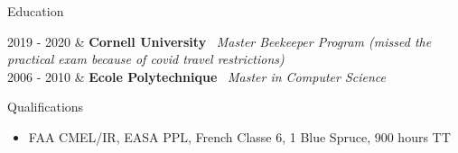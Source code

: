 \documentclass{cv}
\newcommand{\activite}[1]{\textbf{#1}\ }
\newcommand{\comment}[1]{\textsl{#1}\ }
\begin{document}
\begin{rubriquetableau}[4.0cm]{Education}


  2019 - 2020
	& \activite{Cornell University}
	\comment{Master Beekeeper Program (missed the practical exam because of covid travel restrictions)} \\[1mm]

2006 - 2010
	& \activite{Ecole Polytechnique}
	\comment{Master in Computer Science}

 \end{rubriquetableau}

\begin{rubrique}{Qualifications}
\begin{itemize}
\item FAA CMEL/IR, EASA PPL, French Classe 6, 1 Blue Spruce, 900 hours TT
\end{itemize}
\end{rubrique}
\end{document}
